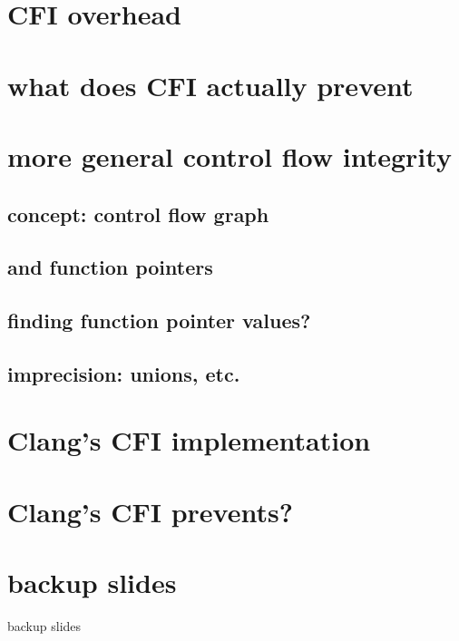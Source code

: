 \section{CFI overhead}


\section{what does CFI actually prevent}

\section{more general control flow integrity}

\subsection{concept: control flow graph}

\subsection{and function pointers}


\subsection{finding function pointer values?}



\subsection{imprecision: unions, etc.}


\section{Clang's CFI implementation}


\section{Clang's CFI prevents?}


\section{backup slides}
\begin{frame}{backup slides}
\end{frame}

